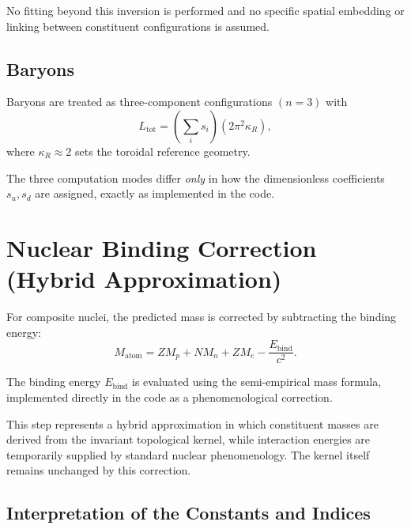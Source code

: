 \documentclass[11pt,a4paper]{article}
\begin{document}
            No fitting beyond this inversion is performed and no specific spatial embedding or linking between constituent configurations is assumed.


        \subsection{Baryons}

            Baryons are treated as three-component configurations $(n=3)$ with
            \begin{equation}
                L_{\text{tot}} = \left(\sum_i s_i\right)
                \left(2\pi^2 \kappa_R\right),
            \end{equation}
            where $\kappa_R \approx 2$ sets the toroidal reference geometry.

            The three computation modes differ \emph{only} in how the dimensionless
            coefficients $s_u, s_d$ are assigned, exactly as implemented in the code.

    \section{Nuclear Binding Correction (Hybrid Approximation)}
    

        For composite nuclei, the predicted mass is corrected by subtracting
        the binding energy:
        \begin{equation}
            M_{\text{atom}}
            =
            Z M_p + N M_n + Z M_e
            -
            \frac{E_{\text{bind}}}{c^2}.
        \end{equation}

        The binding energy $E_{\text{bind}}$ is evaluated using the
        semi-empirical mass formula, implemented directly in the code
        as a phenomenological correction.

        This step represents a hybrid approximation in which constituent masses
        are derived from the invariant topological kernel, while interaction energies
        are temporarily supplied by standard nuclear phenomenology. The kernel itself remains
        unchanged by this correction.
        

        \subsection{Interpretation of the Constants and Indices}
\end{document}
